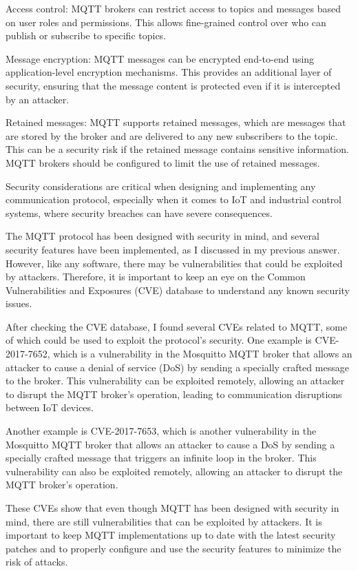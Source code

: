 Access control: MQTT brokers can restrict access to topics and messages based on user roles and permissions. This allows fine-grained control over who can publish or subscribe to specific topics.

Message encryption: MQTT messages can be encrypted end-to-end using application-level encryption mechanisms. This provides an additional layer of security, ensuring that the message content is protected even if it is intercepted by an attacker.

Retained messages: MQTT supports retained messages, which are messages that are stored by the broker and are delivered to any new subscribers to the topic. This can be a security risk if the retained message contains sensitive information. MQTT brokers should be configured to limit the use of retained messages.

Security considerations are critical when designing and implementing any communication protocol, especially when it comes to IoT and industrial control systems, where security breaches can have severe consequences.

The MQTT protocol has been designed with security in mind, and several security features have been implemented, as I discussed in my previous answer. However, like any software, there may be vulnerabilities that could be exploited by attackers. Therefore, it is important to keep an eye on the Common Vulnerabilities and Exposures (CVE) database to understand any known security issues.

After checking the CVE database, I found several CVEs related to MQTT, some of which could be used to exploit the protocol's security. One example is CVE-2017-7652, which is a vulnerability in the Mosquitto MQTT broker that allows an attacker to cause a denial of service (DoS) by sending a specially crafted message to the broker. This vulnerability can be exploited remotely, allowing an attacker to disrupt the MQTT broker's operation, leading to communication disruptions between IoT devices.

Another example is CVE-2017-7653, which is another vulnerability in the Mosquitto MQTT broker that allows an attacker to cause a DoS by sending a specially crafted message that triggers an infinite loop in the broker. This vulnerability can also be exploited remotely, allowing an attacker to disrupt the MQTT broker's operation.

These CVEs show that even though MQTT has been designed with security in mind, there are still vulnerabilities that can be exploited by attackers. It is important to keep MQTT implementations up to date with the latest security patches and to properly configure and use the security features to minimize the risk of attacks.


\clearpage

